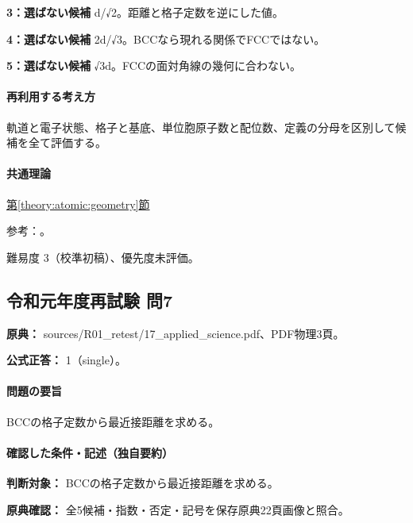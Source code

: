 \noindent\textbf{3：選ばない候補} d/√2。距離と格子定数を逆にした値。\par

\noindent\textbf{4：選ばない候補} 2d/√3。BCCなら現れる関係でFCCではない。\par

\noindent\textbf{5：選ばない候補} √3d。FCCの面対角線の幾何に合わない。\par

\paragraph{再利用する考え方} 軌道と電子状態、格子と基底、単位胞原子数と配位数、定義の分母を区別して候補を全て評価する。

\paragraph{共通理論} \hyperref[theory:atomic:geometry]{第\ref*{theory:atomic:geometry}節}

\par 参考：\cite{openstax_crystals}。

\par 難易度 3（校準初稿）、優先度未評価。

\subsection{令和元年度再試験 問7}
\label{q:r01-ret-applied-07}

\noindent\textbf{原典：} sources/R01\_retest/17\_applied\_science.pdf、PDF物理3頁。

\textbf{公式正答：} 1（single）。

\paragraph{問題の要旨} BCCの格子定数から最近接距離を求める。

\paragraph{確認した条件・記述（独自要約）}\mbox{}\par

\noindent\textbf{判断対象：} BCCの格子定数から最近接距離を求める。\par

\noindent\textbf{原典確認：} 全5候補・指数・否定・記号を保存原典22頁画像と照合。\par


